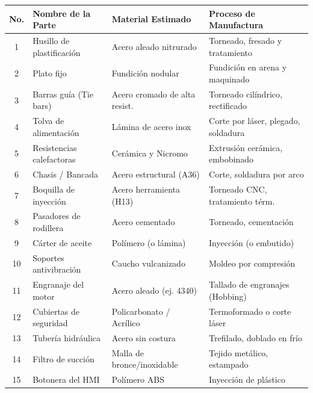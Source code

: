\documentclass[11pt, a4paper]{article}
\begin{document}
\vspace{0.5cm}
\begin{table}[h!]
    \centering
    \renewcommand{\arraystretch}{1.3}
    \small
    \begin{tabularx}{\textwidth}{c X l l}
        \toprule
        \textbf{No.} & \textbf{Nombre de la Parte} & \textbf{Material Estimado} & \textbf{Proceso de Manufactura} \\
        \midrule
        1 & Husillo de plastificación & Acero aleado nitrurado & Torneado, fresado y tratamiento \\
        2 & Plato fijo & Fundición nodular & Fundición en arena y maquinado \\
        3 & Barras guía (Tie bars) & Acero cromado de alta resist. & Torneado cilíndrico, rectificado \\
        4 & Tolva de alimentación & Lámina de acero inox & Corte por láser, plegado, soldadura \\
        5 & Resistencias calefactoras & Cerámica y Nicromo & Extrusión cerámica, embobinado \\
        6 & Chasis / Bancada & Acero estructural (A36) & Corte, soldadura por arco \\
        7 & Boquilla de inyección & Acero herramienta (H13) & Torneado CNC, tratamiento térm. \\
        8 & Pasadores de rodillera & Acero cementado & Torneado, cementación \\
        9 & Cárter de aceite & Polímero (o lámina) & Inyección (o embutido) \\
        10 & Soportes antivibración & Caucho vulcanizado & Moldeo por compresión \\
        11 & Engranaje del motor & Acero aleado (ej. 4340) & Tallado de engranajes (Hobbing) \\
        12 & Cubiertas de seguridad & Policarbonato / Acrílico & Termoformado o corte láser \\
        13 & Tubería hidráulica & Acero sin costura & Trefilado, doblado en frío \\
        14 & Filtro de succión & Malla de bronce/inoxidable & Tejido metálico, estampado \\
        15 & Botonera del HMI & Polímero ABS & Inyección de plástico \\
        \bottomrule
    \end{tabularx}
\end{table}
\end{document}

